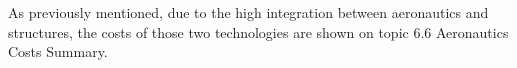 
As previously mentioned, due to the high integration between aeronautics and structures, the costs of those two technologies are shown on topic 6.6 Aeronautics Costs Summary.

